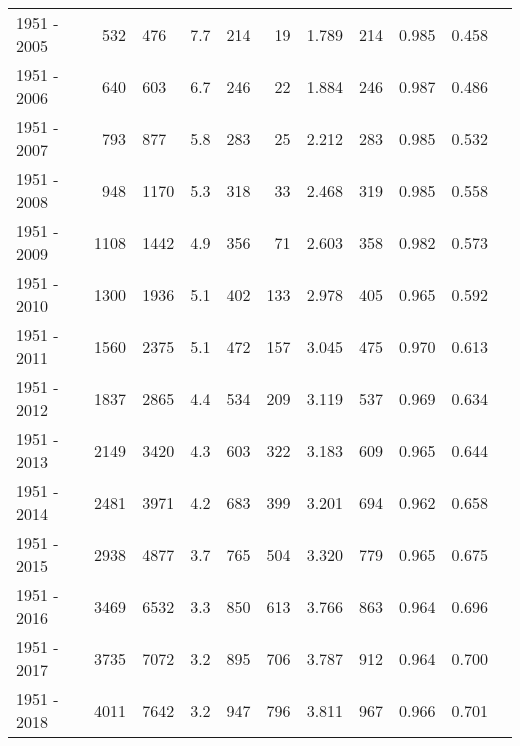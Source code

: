 \begin{tabular}{grgrgrgrgrg}
1951 - 2005 &      532 &      476 &    7.7 &                     214 &                         19 &       1.789 &            214 &       0.985 &             0.458 \\
1951 - 2006 &      640 &      603 &    6.7 &                     246 &                         22 &       1.884 &            246 &       0.987 &             0.486 \\
1951 - 2007 &      793 &      877 &    5.8 &                     283 &                         25 &       2.212 &            283 &       0.985 &             0.532 \\
1951 - 2008 &      948 &     1170 &    5.3 &                     318 &                         33 &       2.468 &            319 &       0.985 &             0.558 \\
1951 - 2009 &     1108 &     1442 &    4.9 &                     356 &                         71 &       2.603 &            358 &       0.982 &             0.573 \\
1951 - 2010 &     1300 &     1936 &    5.1 &                     402 &                        133 &       2.978 &            405 &       0.965 &             0.592 \\
1951 - 2011 &     1560 &     2375 &    5.1 &                     472 &                        157 &       3.045 &            475 &       0.970 &             0.613 \\
1951 - 2012 &     1837 &     2865 &    4.4 &                     534 &                        209 &       3.119 &            537 &       0.969 &             0.634 \\
1951 - 2013 &     2149 &     3420 &    4.3 &                     603 &                        322 &       3.183 &            609 &       0.965 &             0.644 \\
1951 - 2014 &     2481 &     3971 &    4.2 &                     683 &                        399 &       3.201 &            694 &       0.962 &             0.658 \\
1951 - 2015 &     2938 &     4877 &    3.7 &                     765 &                        504 &       3.320 &            779 &       0.965 &             0.675 \\
1951 - 2016 &     3469 &     6532 &    3.3 &                     850 &                        613 &       3.766 &            863 &       0.964 &             0.696 \\
1951 - 2017 &     3735 &     7072 &    3.2 &                     895 &                        706 &       3.787 &            912 &       0.964 &             0.700 \\
1951 - 2018 &     4011 &     7642 &    3.2 &                     947 &                        796 &       3.811 &            967 &       0.966 &             0.701 \\
\bottomrule
\end{tabular}
